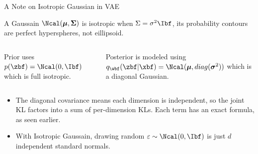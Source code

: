 \documentclass[aspectratio=169,xcolor=dvipsnames,svgnames,x11names,fleqn]{beamer}
\begin{document}
\begin{frame}{A Note on Isotropic Gaussian in VAE}

A Gaussain $\Ncal(\bm\mu, \bm\Sigma)$ is isotropic when $\Sigma = \sigma^2 \Ibf$,  its probability contours are perfect hyperspheres, not eillipsoid.

\begin{columns}


    \begin{tcolorbox}[enhanced, borderline west={2pt}{0pt}{red!70!black}, colback=red!5, frame hidden, sharp corners]
    
    Prior uses $p(\zbf) = \Ncal(0, \Ibf)$ which is full isotropic.
  
    \end{tcolorbox}



    \begin{tcolorbox}[enhanced, borderline east={2pt}{0pt}{WGANBlue!70!black}, colback=WGANBlue!5, frame hidden, sharp corners]
    
    Posterior is modeled using $q_\wbf(\zbf|\xbf) = \Ncal(\bm\mu, diag(\bm\sigma^2))$ which is a diagonal Gaussian.
  
    \end{tcolorbox}
    
\end{columns}

\begin{itemize}
\item  The diagonal covariance means each dimension is independent, so the joint KL factors into a sum of per-dimension KLs. Each term has an exact formula, as seen earlier.

\item With Isotropic Gaussain, drawing random $\varepsilon \sim \Ncal(0, \Ibf)$ is just $d$ independent standard normals.
\end{itemize}

\end{frame}
\end{document}
